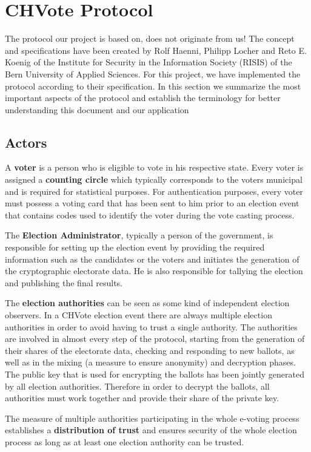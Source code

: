 \chapter{CHVote Protocol}
The protocol our project is based on, does not originate from us! The concept and specifications have been created by Rolf Haenni, Philipp Locher and Reto E. Koenig of the Institute for Security in the Information Society (RISIS) of the Bern University of Applied Sciences. For this project, we have implemented the protocol according to their specification. In this section we summarize the most important aspects of the protocol and establish the terminology for better understanding this document and our application

\section{Actors}
A \textbf{voter} is a person who is eligible to vote in his respective state. Every voter is assigned a \textbf{counting circle} which typically corresponds to the voters municipal and is required for statistical purposes. For authentication purposes, every voter must possess a voting card that has been sent to him prior to an election event that contains codes used to identify the voter during the vote casting process.

The \textbf{Election Administrator}, typically a person of the government, is responsible for setting up the election event by providing the required information such as the candidates or the voters and initiates the generation of the cryptographic electorate data. He is also responsible for tallying the election and publishing the final results.

The \textbf{election authorities} can be seen as some kind of independent election observers. In a CHVote election event there are always multiple election authorities in order to avoid having to trust a single authority. The authorities are involved in almost every step of the protocol, starting from the generation of their shares of the electorate data, checking and responding to new ballots, as well as in the mixing (a measure to ensure anonymity) and decryption phases. The public key that is used for encrypting the ballots has been jointly generated by all election authorities. Therefore in order to decrypt the ballots, all authorities must work together and provide their share of the private key. 

The measure of multiple authorities participating in the whole e-voting process establishes a \textbf{distribution of trust} and ensures security of the whole election process as long as at least one election authority can be trusted.

